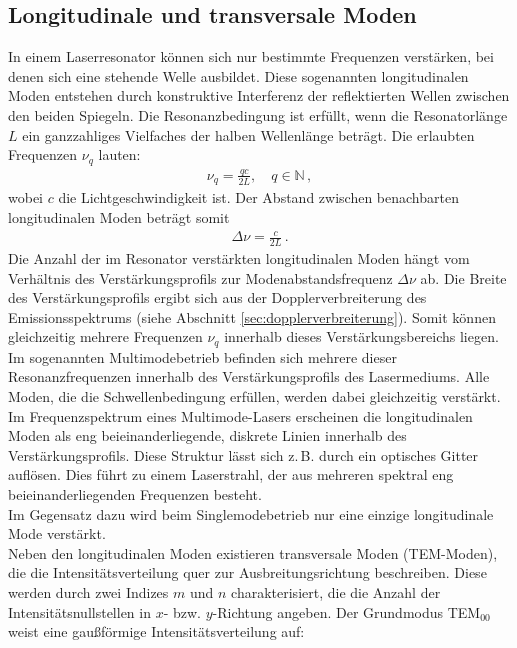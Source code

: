 \subsection{Longitudinale und transversale Moden}
In einem Laserresonator können sich nur bestimmte Frequenzen verstärken, bei denen sich eine stehende Welle ausbildet. 
Diese sogenannten longitudinalen Moden entstehen durch konstruktive Interferenz der reflektierten Wellen zwischen den beiden Spiegeln. 
Die Resonanzbedingung ist erfüllt, wenn die Resonatorlänge $L$ ein ganzzahliges Vielfaches der halben Wellenlänge beträgt. Die erlaubten Frequenzen $\nu_q$ lauten:
\begin{align}
    \nu_q = \frac{q c}{2L}, \quad q \in \mathbb{N}\,, \label{eqn:longmoden}
\end{align}
wobei $c$ die Lichtgeschwindigkeit ist. 
Der Abstand zwischen benachbarten longitudinalen Moden beträgt somit
\begin{align}
    \Delta \nu = \frac{c}{2L}\,. \label{eqn:modenabstand}
\end{align}
Die Anzahl der im Resonator verstärkten longitudinalen Moden hängt vom Verhältnis des Verstärkungsprofils zur Modenabstandsfrequenz $\Delta \nu$ ab. 
Die Breite des Verstärkungsprofils ergibt sich aus der Dopplerverbreiterung des Emissionsspektrums (siehe Abschnitt \ref{sec:dopplerverbreiterung}).
Somit können gleichzeitig mehrere Frequenzen $\nu_q$ innerhalb dieses Verstärkungsbereichs liegen.\\
Im sogenannten Multimodebetrieb befinden sich mehrere dieser Resonanzfrequenzen innerhalb des Verstärkungsprofils des Lasermediums. 
Alle Moden, die die Schwellenbedingung erfüllen, werden dabei gleichzeitig verstärkt. Im Frequenzspektrum eines Multimode-Lasers erscheinen die longitudinalen Moden als eng beieinanderliegende, diskrete Linien innerhalb des Verstärkungsprofils. Diese Struktur lässt sich z. B. durch ein optisches Gitter auflösen. 
Dies führt zu einem Laserstrahl, der aus mehreren spektral eng beieinanderliegenden Frequenzen besteht.\\
Im Gegensatz dazu wird beim Singlemodebetrieb nur eine einzige longitudinale Mode verstärkt.\\
Neben den longitudinalen Moden existieren transversale Moden (TEM-Moden), die die Intensitätsverteilung quer zur Ausbreitungsrichtung beschreiben. 
Diese werden durch zwei Indizes $m$ und $n$ charakterisiert, die die Anzahl der Intensitätsnullstellen in $x$- bzw. $y$-Richtung angeben. 
Der Grundmodus TEM$_{00}$ weist eine gaußförmige Intensitätsverteilung auf:
